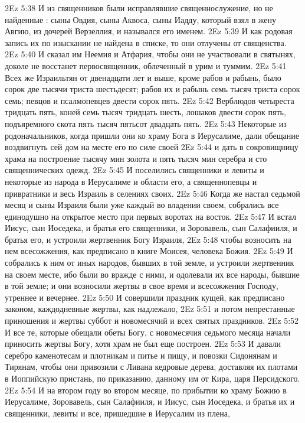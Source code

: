 \vs 2Ez 5:38 И из священников были исправлявшие священнослужение, но не найденные : сыны Овдия, сыны Аквоса, сыны Иадду, который взял в жену Авгию, из дочерей Верзеллия, и назывался его именем.
\vs 2Ez 5:39 И как родовая запись их по изыскании не найдена в списке, то они отлучены от священства.
\vs 2Ez 5:40 И сказал им Неемия и Атфария, чтобы они не участвовали в святынях, доколе не восстанет первосвященник, облеченный в урим и туммим.
\rsbpar\vs 2Ez 5:41 Всех же Израильтян от двенадцати лет и выше, кроме рабов и рабынь, было сорок две тысячи триста шестьдесят; рабов их и рабынь семь тысяч триста сорок семь; певцов и псалмопевцев двести сорок пять.
\vs 2Ez 5:42 Верблюдов четыреста тридцать пять, коней семь тысяч тридцать шесть, лошаков двести сорок пять, подъяремного скота пять тысяч пятьсот двадцать пять.
\vs 2Ez 5:43 Некоторые из родоначальников, когда пришли они ко храму Бога в Иерусалиме, дали обещание воздвигнуть сей дом на месте его по силе своей
\vs 2Ez 5:44 и дать в сокровищницу храма на построение тысячу мин золота и пять тысяч мин серебра и сто священнических одежд.
\vs 2Ez 5:45 И поселились священники и левиты и некоторые из народа в Иерусалиме и области его, а священнопевцы и привратники и весь Израиль в селениях своих.
\rsbpar\vs 2Ez 5:46 Когда же настал седьмой месяц и сыны Израиля были уже каждый во владении своем, собрались все единодушно на открытое место при первых воротах на восток.
\vs 2Ez 5:47 И встал Иисус, сын Иоседека, и братья его священники, и Зоровавель, сын Салафииля, и братья его, и устроили жертвенник Богу Израиля,
\vs 2Ez 5:48 чтобы возносить на нем всесожжения, как предписано в книге Моисея, человека Божия.
\vs 2Ez 5:49 И собрались к ним от иных народов, бывших в той земле, и устроили жертвенник на своем месте, ибо были во вражде с ними, и одолевали их все народы, бывшие в той земле; и они возносили жертвы в свое время и всесожжения Господу, утреннее и вечернее.
\vs 2Ez 5:50 И совершили праздник кущей, как предписано законом,  каждодневные жертвы, как надлежало,
\vs 2Ez 5:51 и потом непрестанные приношения и жертвы суббот и новомесячий и всех святых праздников.
\vs 2Ez 5:52 И все те, которые обещали обеты Богу, с новомесячия седьмого месяца начали приносить жертвы Богу, хотя храм не был еще построен.
\vs 2Ez 5:53 И давали серебро каменотесам и плотникам и питье и пищу, и повозки Сидонянам и Тирянам, чтобы они привозили с Ливана кедровые дерева, доставляя их плотами в Иоппийскую пристань, по приказанию, данному им от Кира, царя Персидского.
\rsbpar\vs 2Ez 5:54 И на втором году во втором месяце, по прибытии ко храму Божию в Иерусалиме, Зоровавель, сын Салафииля, и Иисус, сын Иоседека, и братья их и священники, левиты и все, пришедшие в Иерусалим из плена,
